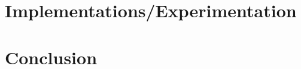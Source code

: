 \documentclass[letterpaper, 10 pt, conference]{ieeeconf}  %
\begin{document}
\section{Implementations/Experimentation}

\section{Conclusion}



\end{document}
